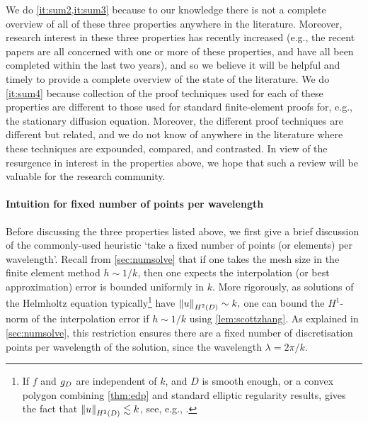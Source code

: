We do \cref{it:sum2,it:sum3} because to our knowledge there is not a complete overview of all of these three properties anywhere in the literature. Moreover, research interest in these three properties has recently increased (e.g., the recent papers \cite{ChNi:18,ChGaNiTo:18,ChNi:19,LiWu:19} are all concerned with one or more of these properties, and have all been completed within the last two years), and so we believe it will be helpful and timely to provide a complete overview of the state of the literature. We do \cref{it:sum4} because collection of the proof techniques used for each of these properties are different to those used for standard finite-element proofs for, e.g., the stationary diffusion equation. Moreover, the different proof techniques are different but related, and we do not know of anywhere in the literature where these techniques are expounded, compared, and contrasted. In view of the resurgence in interest in the properties above, we hope that such a review will be valuable for the research community.

      

\paragraph{Intuition for fixed number of points per wavelength} Before discussing the three properties listed above, we first give a brief discussion of the commonly-used heuristic `take a fixed number of points (or elements) per wavelength'.  Recall from \cref{sec:numsolve} that if one takes the mesh size in the finite element method $h \sim 1/k$, then one expects the interpolation (or best approximation) error is bounded uniformly in $k$. More rigorously, as solutions of the Helmholtz equation typically\footnote{If $f$ and $g_{D}$ are independent of $k$, and $D$ is smooth enough, or a convex polygon  combining \cref{thm:edp} and standard elliptic regularity results, gives the fact that $\NHtD{u} \lesssim k$, see, e.g., \cite[Lemma 2.12]{GaGrSp:15}.} have $\NHtD{u} \sim k,$ one can bound the $H^1$-norm of the interpolation error if $h \sim 1/k$ using \cref{lem:scottzhang}.  As explained in \cref{sec:numsolve}, this restriction ensures there are a fixed number of discretisation points per wavelength of the solution, since the wavelength $\lambda = 2\pi/k.$

